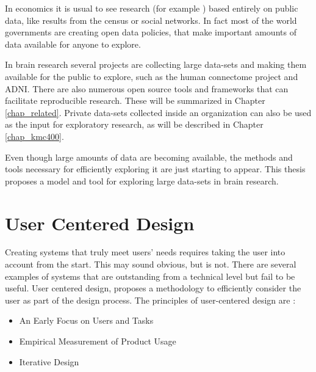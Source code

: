 In economics it is usual to see research (for example \autocite{levitt_freakonomics_2006}) based entirely on public data, like results from the census or social networks. In fact most of the world governments are creating open data policies, that make important amounts of data available for anyone to explore.

In brain research several projects are collecting large data-sets and making them available for the public to explore, such as the human connectome project\autocite{rosen_human_2010} and ADNI\autocite{jack_alzheimers_2008}. There are also numerous open source tools and frameworks that can facilitate reproducible research. These will be summarized in Chapter \ref{chap_related}. Private data-sets collected inside an organization can also be used as the input for exploratory research, as will be described in Chapter \ref{chap_kmc400}.

Even though large amounts of data are becoming available, the methods and tools necessary for efficiently exploring it are just starting to appear. This thesis proposes a model and tool for exploring large data-sets in brain research.









\section{User Centered Design}

Creating systems that truly meet users' needs requires taking the user into account from the start. This may sound obvious, but is not. There are several examples of systems that are outstanding from a technical level but fail to be useful\autocite{norman_design_2002}. User centered design\autocite{baxter_understanding_2005}, proposes a methodology to efficiently consider the user as part of the design process.
The principles of user-centered design are \autocite{baxter_understanding_2005} :

\begin{itemize}
	\item An Early Focus on Users and Tasks
	\item Empirical Measurement of Product Usage
	\item Iterative Design
\end{itemize}


